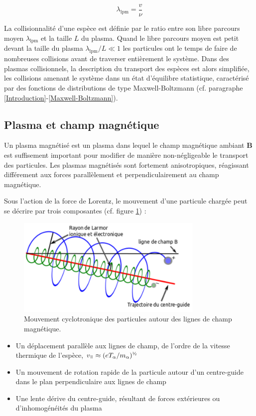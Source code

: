 \begin{equation}
	\lambda_\text{lpm}=\frac{v}{\nu}
\end{equation} 

La collisionnalité d'une espèce est
définie par le ratio entre son libre parcours moyen $\lambda_\text{lpm}$ et la
taille $L$ du plasma. Quand le libre parcours moyen est petit devant la
taille du plasma $\lambda_\text{lpm}/L\ll 1$
les particules ont le temps de faire de nombreuses collisions avant de
traverser entièrement le système. Dans des plasmas collisionnels, la description
du transport des espèces est alors simplifiée, les collisions amenant le système dans un état
d'équilibre statistique, caractérisé par des fonctions de distributions de
type Maxwell-Boltzmann (cf. paragraphe \ref{Introduction}-\ref{Maxwell-Boltzmann}).

\subsection{Plasma et champ magnétique} 
Un plasma magnétisé est un plasma dans lequel le champ magnétique ambiant
$\mathbf{B}$ est suffisement important pour modifier de manière non-négligeable
le transport des particules. Les plasmas magnétisés sont fortement
anisotropiques, réagissant différement aux forces parallèlement et
perpendiculairement au champ magnétique.

Sous l'action de la force de Lorentz, le mouvement d'une particule chargée peut
se décrire par trois composantes (cf. figure \ref{1-particleDrifts}) :

\begin{figure}[htbp]
\centering
\includegraphics[width=0.8\textwidth]{figures/mouvementCyclotron.png}
{\caption{Mouvement cyclotronique des particules autour des lignes de champ
magnétique.}\label{1-particleDrifts}}
\end{figure}

\begin{itemize}
  \item Un déplacement parallèle aux lignes de champ, de l'ordre de la vitesse
  thermique de l'espèce, $v_\para\approx
  (eT_\alpha/m_\alpha)^{\text{\textonehalf}}$
  \item Un mouvement de rotation rapide de la particule
  autour d'un centre-guide dans le plan perpendiculaire aux lignes de champ
  \item Une lente dérive du centre-guide, résultant de forces extérieures ou
  d'inhomogénéités du plasma
\end{itemize}

